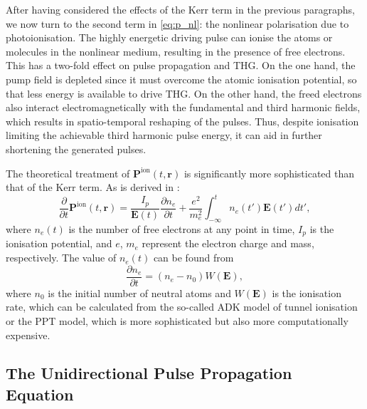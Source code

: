 \documentclass[a4paper]{jpconf}
\begin{document}
After having considered the effects of the Kerr term in the previous paragraphs, we now turn to the second term in \eqref{eq:p_nl}: the nonlinear polarisation due to photoionisation. The highly energetic driving pulse can ionise the atoms or molecules in the nonlinear medium, resulting in the presence of free electrons. This has a two-fold effect on pulse propagation and THG. On the one hand, the pump field is depleted since it must overcome the atomic ionisation potential, so that less energy is available to drive THG. On the other hand, the freed electrons also interact electromagnetically with the fundamental and third harmonic fields, which results in spatio-temporal reshaping of the pulses. Thus, despite ionisation limiting the achievable third harmonic pulse energy, it can aid in further shortening the generated pulses. \par 
The theoretical treatment of $\mathbf{P}^\text{ion}(t, \mathbf{r})$ is significantly more sophisticated than that of the Kerr term. As is derived in \cite{geissler1999}:
\begin{equation}\label{eq:p_ion}
\frac{\partial}{\partial t} \mathbf{P}^\text{ion}(t, \mathbf{r}) = \frac{I_p}{\mathbf{E}(t)} \frac{\partial n_e}{\partial t} + \frac{e^2}{m_e^2} \int_{-\infty}^t n_e(t') \mathbf{E}(t')dt',
\end{equation} 
where $n_e(t)$ is the number of free electrons at any point in time, $I_p$ is the ionisation potential, and $e$, $m_e$ represent the electron charge and mass, respectively. The value of $n_e(t)$ can be found from 
\begin{equation}
\frac{\partial n_e}{\partial t} = (n_e - n_0) W(\mathbf{E}),
\end{equation}
where $n_0$ is the initial number of neutral atoms and $W(\mathbf{E})$ is the ionisation rate, which can be calculated from the so-called ADK model of tunnel ionisation or the PPT model, which is more sophisticated but also more computationally expensive. 

\subsection{The Unidirectional Pulse Propagation Equation}
\end{document}
